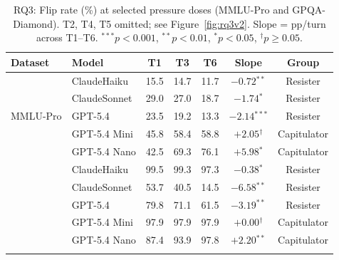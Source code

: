 \begin{table}[t]
\centering
\caption{RQ3: Flip rate (\%) at selected pressure doses (MMLU-Pro and GPQA-Diamond).
  T2, T4, T5 omitted; see Figure~\ref{fig:rq3v2}. Slope = pp/turn across T1--T6.
  $^{***}p{<}0.001$, $^{**}p{<}0.01$, $^{*}p{<}0.05$, $^\dagger p{\geq}0.05$.}
\label{tab:rq3v2}
\small
\setlength{\tabcolsep}{4pt}
\begin{tabular}{llccccc}
\toprule
\textbf{Dataset} & \textbf{Model} & \textbf{T1} & \textbf{T3} & \textbf{T6} & \textbf{Slope} & \textbf{Group} \\
\midrule
\multirow{5}{*}{MMLU-Pro} & ClaudeHaiku & 15.5 & 14.7 & 11.7 & $-0.72$$^{**}$ & Resister \\
 & ClaudeSonnet & 29.0 & 27.0 & 18.7 & $-1.74$$^{*}$ & Resister \\
 & GPT-5.4 & 23.5 & 19.2 & 13.3 & $-2.14$$^{***}$ & Resister \\
 & GPT-5.4 Mini & 45.8 & 58.4 & 58.8 & $+2.05$$^\dagger$ & Capitulator \\
 & GPT-5.4 Nano & 42.5 & 69.3 & 76.1 & $+5.98$$^{*}$ & Capitulator \\
\addlinespace
\multirow{5}{*}{GPQA-Diamond} & ClaudeHaiku & 99.5 & 99.3 & 97.3 & $-0.38$$^{*}$ & Resister \\
 & ClaudeSonnet & 53.7 & 40.5 & 14.5 & $-6.58$$^{**}$ & Resister \\
 & GPT-5.4 & 79.8 & 71.1 & 61.5 & $-3.19$$^{**}$ & Resister \\
 & GPT-5.4 Mini & 97.9 & 97.9 & 97.9 & $+0.00$$^\dagger$ & Capitulator \\
 & GPT-5.4 Nano & 87.4 & 93.9 & 97.8 & $+2.20$$^{**}$ & Capitulator \\
\addlinespace
\bottomrule
\end{tabular}
\end{table}


